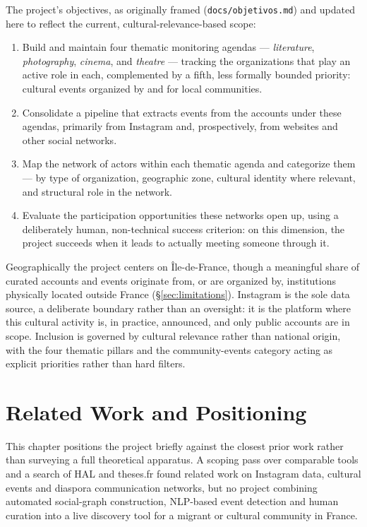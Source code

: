\documentclass[12pt, a4paper]{report}
\begin{document}
The project's objectives, as originally framed (\texttt{docs/objetivos.md})
and updated here to reflect the current, cultural-relevance-based scope:

\begin{enumerate}
    \item Build and maintain four thematic monitoring agendas —
    \emph{literature}, \emph{photography}, \emph{cinema}, and
    \emph{theatre} — tracking the organizations that play an active role
    in each, complemented by a fifth, less formally bounded priority:
    cultural events organized by and for local communities.
    \item Consolidate a pipeline that extracts events from the accounts
    under these agendas, primarily from Instagram and, prospectively,
    from websites and other social networks.
    \item Map the network of actors within each thematic agenda and
    categorize them — by type of organization, geographic zone, cultural
    identity where relevant, and structural role in the network.
    \item Evaluate the participation opportunities these networks open
    up, using a deliberately human, non-technical success criterion: on
    this dimension, the project succeeds when it leads to actually
    meeting someone through it.
\end{enumerate}

Geographically the project centers on Île-de-France, though a meaningful
share of curated accounts and events originate from, or are organized by,
institutions physically located outside France (\S\ref{sec:limitations}).
Instagram is the sole data source, a deliberate boundary rather than an
oversight: it is the platform where this cultural activity is, in
practice, announced, and only public accounts are in scope. Inclusion is
governed by cultural relevance rather than national origin, with the four
thematic pillars and the community-events category acting as explicit
priorities rather than hard filters.


\chapter{Related Work and Positioning}
\label{ch:litreview}
This chapter positions the project briefly against the closest prior
work rather than surveying a full theoretical apparatus. A scoping pass
over comparable tools and a search of HAL and theses.fr found related
work on Instagram data, cultural events and diaspora communication
networks, but no project combining automated social-graph construction,
NLP-based event detection and human curation into a live discovery tool
for a migrant or cultural community in France.
\end{document}
